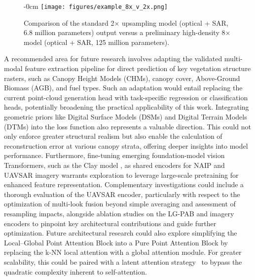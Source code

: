 \documentclass[remotesensing,article,accept,pdftex,moreauthors]{Definitions/mdpi}
\renewcommand{\hl}[1]{#1}
\begin{document}
 \vspace{-6pt}

\begin{figure}[H]
    \begin{adjustwidth}{-\extralength}{0cm}
    \centering
    \texttt{[image: figures/example\_8x\_v\_2x.png]}
    \end{adjustwidth}
    \caption{\hl{Comparison} %
 of the standard 2× upsampling model (optical + SAR, 6.8 million parameters) output versus a preliminary high-density 8× model (optical + SAR, 125 million parameters).}
    \label{fig:upsampling_comparison_8x}
\end{figure}

\newpage

A recommended area for future research involves adapting the validated multi-modal feature extraction pipeline for direct prediction of key vegetation structure rasters, such as Canopy Height Models (CHMs), canopy cover, Above-Ground Biomass (AGB), and fuel types. Such an adaptation would entail replacing the current point-cloud generation head with task-specific regression or classification heads, potentially broadening the practical applicability of this work. Integrating geometric priors like Digital Surface Models (DSMs) and Digital Terrain Models (DTMs) into the loss function also represents a valuable direction. This could not only enforce greater structural realism but also enable the calculation of reconstruction error at various canopy strata, offering deeper insights into model performance. Furthermore, fine-tuning emerging foundation-model vision Transformers, such as the Clay model \cite{clay_model_v1p5}, as shared encoders for NAIP and UAVSAR imagery warrants exploration to leverage large-scale pretraining for enhanced feature representation. Complementary investigations could include a thorough evaluation of the UAVSAR encoder, particularly with respect to the optimization of multi-look fusion beyond simple averaging and assessment of resampling impacts, alongside ablation studies on the LG-PAB and imagery encoders to pinpoint key architectural contributions and guide further optimization. Future architectural research could also explore simplifying the Local--Global Point Attention Block into a Pure Point Attention Block by replacing the k-NN local attention with a global attention module. For greater scalability, this could be paired with a latent attention \mbox{strategy \cite{liu2024deepseek}} to bypass the quadratic complexity inherent to self-attention.
\end{document}
